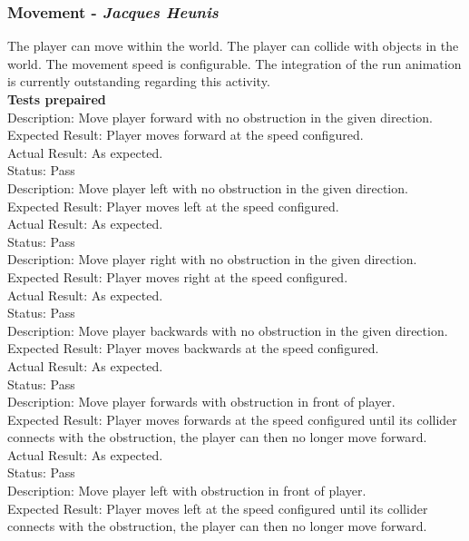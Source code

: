 \documentclass[a4paper,10pt]{article}
\begin{document}
\subsubsection{Movement - \textit{Jacques Heunis}}
The player can move within the world. The player can collide with objects in the world. The movement speed is configurable. The integration of the run animation is currently outstanding regarding this activity.
\smallskip\\\textbf{Tests prepaired}\\
Description: Move player forward with no obstruction in the given direction.\\
Expected Result: Player moves forward at the speed configured.\\
Actual Result: As expected.\\
Status: Pass
\smallskip\\
Description: Move player left with no obstruction in the given direction.\\
Expected Result: Player moves left at the speed configured.\\
Actual Result: As expected.\\
Status: Pass
\smallskip\\
Description: Move player right with no obstruction in the given direction.\\
Expected Result: Player moves right at the speed configured.\\
Actual Result: As expected.\\
Status: Pass
\smallskip\\
Description: Move player backwards with no obstruction in the given direction.\\
Expected Result: Player moves backwards at the speed configured.\\
Actual Result: As expected.\\
Status: Pass
\smallskip\\
Description: Move player forwards with obstruction in front of player.\\
Expected Result: Player moves forwards at the speed configured until its collider connects with the obstruction, the player can then no longer move forward.\\
Actual Result:  As expected.\\
Status: Pass
\smallskip\\
Description: Move player left with obstruction in front of player.\\
Expected Result: Player moves left at the speed configured until its collider connects with the obstruction, the player can then no longer move forward.\\
\end{document}
